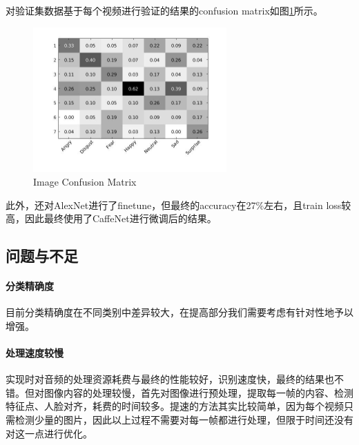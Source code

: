 \documentclass{article}
\begin{document}
\begin{multicols}{2}
                对验证集数据基于每个视频进行验证的结果的confusion matrix如图\ref{fig:5}所示。
                \begin{figure}[H]
                  \centering
                  \includegraphics[width=7.4cm]{confusion.jpg}
                  \caption{Image Confusion Matrix}\label{fig:5}
                \end{figure}

                此外，还对AlexNet进行了finetune，但最终的accuracy在27\%左右，且train loss较高，因此最终使用了CaffeNet进行微调后的结果。

        \subsection{问题与不足}
            \paragraph{分类精确度}
            目前分类精确度在不同类别中差异较大，在提高部分我们需要考虑有针对性地予以增强。

            \paragraph{处理速度较慢}
            实现时对音频的处理资源耗费与最终的性能较好，识别速度快，最终的结果也不错。但对图像内容的处理较慢，首先对图像进行预处理，提取每一帧的内容、检测特征点、人脸对齐，耗费的时间较多。提速的方法其实比较简单，因为每个视频只需检测少量的图片，因此以上过程不需要对每一帧都进行处理，但限于时间还没有对这一点进行优化。





    
    

\end{multicols}
\end{document}
